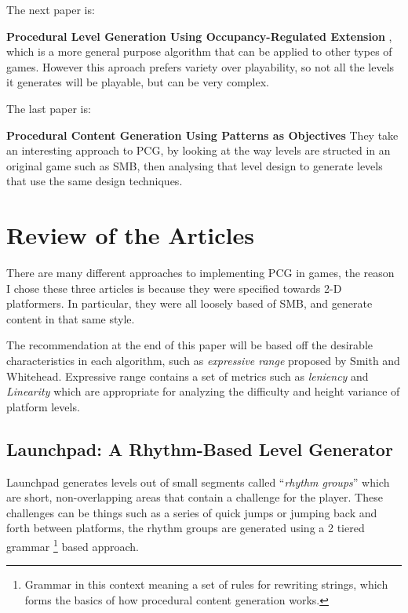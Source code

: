 \documentclass{scrartcl}
\begin{document}
The next paper is:

\textbf{Procedural Level Generation Using Occupancy-Regulated Extension} \cite{mawhorter2010}, which is a more general purpose algorithm that can be applied to other types of games. However this aproach prefers variety over playability, so not all the levels it generates will be playable, but can be very complex.

The last paper is:

\textbf{Procedural Content Generation Using Patterns as Objectives}\cite{dahlskog2014} They take an interesting approach to PCG, by looking at the way levels are structed in an original game such as SMB, then analysing that level design to generate levels that use the same design techniques.



\section{Review of the Articles}

There are many different approaches to implementing PCG in games, the reason I chose these three articles is because they were specified towards 2-D platformers. In particular, they were all loosely based of SMB, and generate content in that same style. 

The recommendation at the end of this paper will be based off the desirable characteristics in each algorithm, such as \textit{expressive range} proposed by Smith and Whitehead\cite{smith2010}. Expressive range contains a set of metrics such as \textit{leniency} and \textit{Linearity} which are appropriate for analyzing the difficulty and height variance of platform levels.

\subsection{Launchpad: A Rhythm-Based Level Generator}

Launchpad generates levels out of small segments called ``\textit{rhythm groups}''  which are short, non-overlapping areas that contain a challenge for the player. These challenges can be things such as a series of quick jumps or jumping back and forth between platforms, the rhythm groups are generated using a 2 tiered grammar \footnote{Grammar in this context meaning a set of rules for rewriting strings, which forms the basics of how procedural content generation works\cite{shaker2015}.} based approach.
\end{document}
